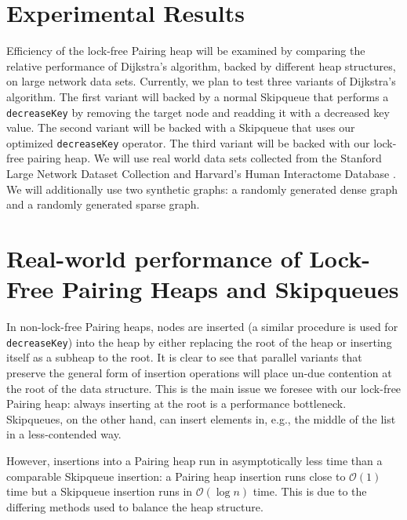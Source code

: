 \documentclass{acm_proc_article-sp}
\begin{document}
\section{Experimental Results}
Efficiency of the lock-free Pairing heap will be examined by comparing the relative performance of Dijkstra's algorithm, backed by different heap structures, on large network data sets. Currently, we
plan to test three variants of Dijkstra's algorithm. The first variant will backed by a normal Skipqueue that performs a \texttt{decreaseKey} by removing the target node and readding it with a decreased key value.
The second variant will be backed with a Skipqueue that uses our optimized \texttt{decreaseKey} operator. The third variant will be backed with our lock-free pairing heap. We
will use real world data sets collected from the Stanford Large Network Dataset Collection \cite{slndc} and Harvard's Human Interactome Database \cite{hid}. We will additionally use two
synthetic graphs: a randomly generated dense graph and a randomly generated sparse graph.


\section{Real-world performance of Lock-Free Pairing Heaps and Skipqueues}
In non-lock-free Pairing heaps, nodes are inserted (a similar procedure is used for \texttt{decreaseKey})
into the heap by either replacing the root of the heap or inserting itself as a subheap to the root. It is clear to see that
parallel variants that preserve the general form of insertion operations will place un-due contention at the
root of the data structure. This is the main issue we foresee with our lock-free Pairing heap: always inserting at the root
is a performance bottleneck. Skipqueues, on the other hand, can insert elements in, e.g., the middle of the list in a less-contended way.

However, insertions into a Pairing heap run in asymptotically less time than a comparable Skipqueue insertion: a Pairing heap
insertion runs close to $\mathcal{O}(1)$ time but a Skipqueue insertion runs in $\mathcal{O}(\log n)$ time. This is due
to the differing methods used to balance the heap structure.
\end{document}
